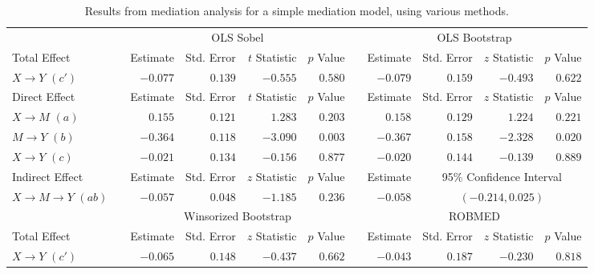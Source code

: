 \documentclass{article}\usepackage[]{graphicx}\usepackage[]{xcolor}
\begin{document}
\begin{sidewaystable}[h!]
\caption{Results from mediation analysis for a simple mediation model, using various methods.}
\begin{center}
\begin{tabular}{llrrrrlrrrr}
\hline\noalign{\smallskip}
 & & \multicolumn{4}{c}{OLS Sobel} & & \multicolumn{4}{c}{OLS Bootstrap} \\ 
\noalign{\smallskip}\cline{3-6}\cline{8-11}\noalign{\smallskip}
Total Effect &  & Estimate & Std. Error & $t$ Statistic & $p$ Value &  & Estimate & Std. Error & $z$ Statistic & $p$ Value \\ 
\noalign{\smallskip}\hline\noalign{\smallskip}
$X \rightarrow Y$ $(c')$ &  & $-0.077$ & $ 0.139$ & $-0.555$ & $ 0.580$ &  & $-0.079$ & $ 0.159$ & $-0.493$ & $ 0.622$ \\ 
\noalign{\smallskip}\hline\noalign{\smallskip}
Direct Effect &  & Estimate & Std. Error & $t$ Statistic & $p$ Value &  & Estimate & Std. Error & $z$ Statistic & $p$ Value \\ 
\noalign{\smallskip}\hline\noalign{\smallskip}
$X \rightarrow M$ $(a)$ &  & $ 0.155$ & $ 0.121$ & $ 1.283$ & $ 0.203$ &  & $ 0.158$ & $ 0.129$ & $ 1.224$ & $ 0.221$ \\ 
$M \rightarrow Y$ $(b)$ &  & $-0.364$ & $ 0.118$ & $-3.090$ & $ 0.003$ &  & $-0.367$ & $ 0.158$ & $-2.328$ & $ 0.020$ \\ 
$X \rightarrow Y$ $(c)$ &  & $-0.021$ & $ 0.134$ & $-0.156$ & $ 0.877$ &  & $-0.020$ & $ 0.144$ & $-0.139$ & $ 0.889$ \\ 
\noalign{\smallskip}\hline\noalign{\smallskip}
Indirect Effect &  & Estimate & Std. Error & $z$ Statistic & $p$ Value &  & Estimate & \multicolumn{3}{c}{95\% Confidence Interval} \\ 
\noalign{\smallskip}\hline\noalign{\smallskip}
$X \rightarrow M \rightarrow Y$ $(ab)$ &  & $-0.057$ & $ 0.048$ & $-1.185$ & $ 0.236$ &  & $-0.058$ & \multicolumn{3}{c}{$(-0.214,  0.025)$} \\ 
\noalign{\smallskip}\hline\noalign{\smallskip}
 & & \multicolumn{4}{c}{Winsorized Bootstrap} & & \multicolumn{4}{c}{ROBMED} \\ 
\noalign{\smallskip}\cline{3-6}\cline{8-11}\noalign{\smallskip}
Total Effect &  & Estimate & Std. Error & $z$ Statistic & $p$ Value &  & Estimate & Std. Error & $z$ Statistic & $p$ Value \\ 
\noalign{\smallskip}\hline\noalign{\smallskip}
$X \rightarrow Y$ $(c')$ &  & $-0.065$ & $ 0.148$ & $-0.437$ & $ 0.662$ &  & $-0.043$ & $ 0.187$ & $-0.230$ & $ 0.818$ \\ 

\end{tabular}
\end{center}
\end{sidewaystable}
\end{document}
